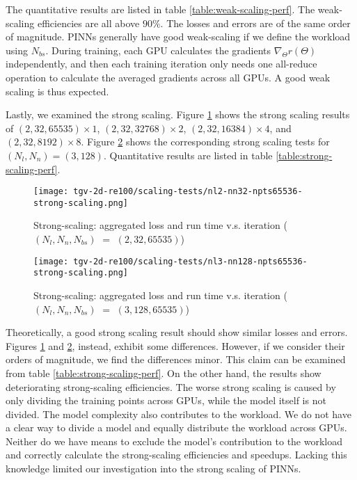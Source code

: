 

The quantitative results are listed in table \ref{table:weak-scaling-perf}.
The weak-scaling efficiencies are all above $90\%$.
The losses and errors are of the same order of magnitude.
PINNs generally have good weak-scaling if we define the workload using $N_{bs}$.
During training, each GPU calculates the gradients $\nabla_{\Theta} r(\Theta)$ independently, and then each training iteration only needs one all-reduce operation to calculate the averaged gradients across all GPUs.
A good weak scaling is thus expected.

Lastly, we examined the strong scaling.
Figure \ref{fig:nl2-nn32-npts65536-strong-scaling} shows the strong scaling results of $(2, 32, 65535)\times 1$, $(2, 32, 32768)\times 2$, $(2, 32, 16384)\times 4$, and $(2, 32, 8192)\times 8$.
Figure \ref{fig:nl3-nn128-npts65536-strong-scaling} shows the corresponding strong scaling tests for $(N_l, N_n)=(3, 128)$.
Quantitative results are listed in table \ref{table:strong-scaling-perf}. 

\begin{figure}[hbt!]
    \centering%
    \texttt{[image: tgv-2d-re100/scaling-tests/nl2-nn32-npts65536-strong-scaling.png]}
    \caption[%
        Strong-scaling: aggregated loss and run time v.s. iteration ($(N_l, N_n, N_{bs})$ $=$ $(2, 32, 65535)$)%
    ]{%
        Strong-scaling: aggregated loss and run time v.s. iteration ($(N_l, N_n, N_{bs})$ $=$ $(2, 32, 65535)$)%
    }\label{fig:nl2-nn32-npts65536-strong-scaling}
\end{figure}

\begin{figure}[hbt!]
    \centering%
    \texttt{[image: tgv-2d-re100/scaling-tests/nl3-nn128-npts65536-strong-scaling.png]}
    \caption[%
        Strong-scaling: aggregated loss and run time v.s. iteration ($(N_l, N_n, N_{bs})$ $=$ $(3, 128, 65535)$)%
    ]{%
        Strong-scaling: aggregated loss and run time v.s. iteration ($(N_l, N_n, N_{bs})$ $=$ $(3, 128, 65535)$)%
    }\label{fig:nl3-nn128-npts65536-strong-scaling}
\end{figure}

Theoretically, a good strong scaling result should show similar losses and errors.
Figures \ref{fig:nl2-nn32-npts65536-strong-scaling} and \ref{fig:nl3-nn128-npts65536-strong-scaling}, instead, exhibit some differences.
However, if we consider their orders of magnitude, we find the differences minor.
This claim can be examined from table \ref{table:strong-scaling-perf}.
On the other hand, the results show deteriorating strong-scaling efficiencies.
The worse strong scaling is caused by only dividing the training points across GPUs, while the model itself is not divided.  
The model complexity also contributes to the workload.
We do not have a clear way to divide a model and equally distribute the workload across GPUs.
Neither do we have means to exclude the model's contribution to the workload and correctly calculate the strong-scaling efficiencies and speedups.
Lacking this knowledge limited our investigation into the strong scaling of PINNs.


